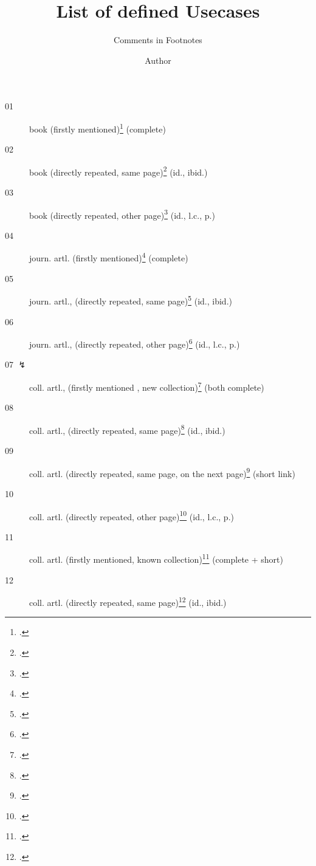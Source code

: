 \documentclass[
  DIV=calc,
  BCOR=5mm,
  11pt,
  headings=small,
  oneside,
  abstract=true,
  toc=bib,
  ngerman,english]{scrartcl}
\begin{document}
\nocite{*}

\titlehead{mycsrf.verify-: English}
\subject{(scholar-) Scientific Texts Based on a Modified \textit{jurabib}}
\title{List of defined Usecases}
\subtitle{Comments in Footnotes}
\author{Author}


\maketitle


\begin{description}

  \item[01 \checkmark] book 
    (firstly  mentioned)\footcite[cf.][12]{KantKdU1974} (complete) 
  \item[02 \checkmark] book (directly repeated,
      same page)\footcite[cf.][12]{KantKdU1974} (id., ibid.)
  \item[03 \checkmark] book (directly repeated, 
      other page)\footcite[cf.][13]{KantKdU1974} (id., l.c., p.)
  \item[04 \checkmark] journ. artl.
    (firstly  mentioned)\footcite[cf.][12]{McCarthy1980a} (complete)
  \item[05 \checkmark] journ. artl., (directly repeated,
       same page)\footcite[cf.][12]{McCarthy1980a} (id., ibid.)
  \item[06 \checkmark] journ. artl., (directly repeated,
       other page)\footcite[cf.][13]{McCarthy1980a} (id., l.c., p.)
  
  \item[07 $\lightning$] coll. artl., (firstly  mentioned , 
      new collection)\footcite[cf.][12]{Hays1985a} (both complete)
  \item[08 \checkmark] coll. artl., (directly repeated,
      same page)\footcite[cf.][12]{Hays1985a} (id., ibid.)
      
 \item[09 \checkmark] coll. artl. (directly repeated,
      same page, on the next page)\footcite[cf.][12]{Hays1985a} (short link)
  \item[10 \checkmark]  coll. artl. (directly repeated,
      other page)\footcite[cf.][13]{Hays1985a} (id., l.c., p.)
       
  \item[11 \checkmark] coll. artl. (firstly  mentioned,
      known collection)\footcite[cf.][12]{DaBu1985a} (complete + short)
  \item[12 \checkmark] coll. artl. (directly repeated,
      same page)\footcite[cf.][12]{DaBu1985a} (id., ibid.)


\end{description}
\end{document}
